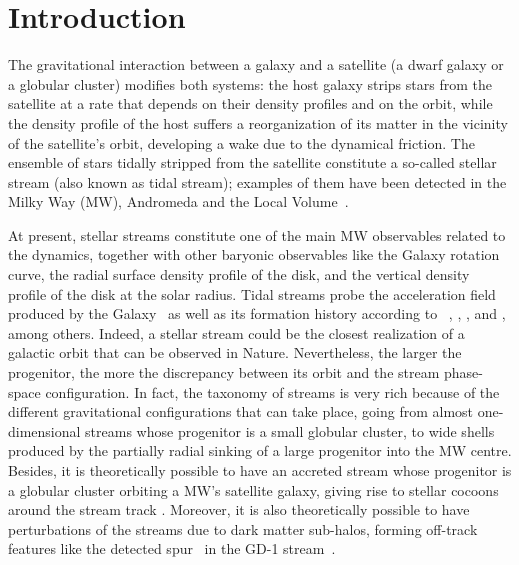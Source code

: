 \documentclass[twocolumn]{aa}
\begin{document}

   \maketitle

\section{Introduction}
The gravitational interaction between a galaxy and a satellite (a dwarf galaxy or a globular cluster) modifies both systems: the host galaxy strips stars from the satellite at a rate
that depends on their density profiles and on the orbit,
while the density profile of the host suffers a reorganization of its matter in the vicinity of the satellite's orbit, developing a wake due to the dynamical friction.
The ensemble of stars tidally stripped from the satellite constitute a so-called stellar stream (also known as tidal stream); examples of them have been detected in the Milky Way (MW), Andromeda and the Local Volume~\citep{Mart_Delgado_2010}.

At present, stellar streams constitute one of the main MW observables related to the dynamics, together with other baryonic observables like the Galaxy rotation curve, the radial surface density profile of the disk, and the vertical density profile of the disk at the solar radius.
Tidal streams probe the acceleration field produced by the Galaxy~\citep{1999ApJ...512L.109J,1999A&A...348L..49Z,2009ApJ...703L..67L,2013MNRAS.436.2386L,2016ASSL..420..169J,Ibata_2016,2017ApJ...842..120I,2017A&A...603A..65T,2021MNRAS.502.4170R} as well as its formation history according to ~\citet{1999Natur.402...53H}, \citet{2020ARA&A..58..205H}, \citet{2022A&A...666A..64R}, and \citet{2023arXiv230708730C}, among others.
Indeed, a stellar stream could be the closest realization of a galactic orbit that can be observed in Nature.
Nevertheless, the larger the progenitor, the more the discrepancy between its orbit and the stream phase-space configuration. In fact, the taxonomy of streams is very rich \citep{2015MNRAS.450..575A} because of the different gravitational configurations that can take place, going from almost one-dimensional streams whose progenitor is a small globular cluster, to wide shells produced by the partially radial sinking of a large progenitor into the MW centre. Besides, it is theoretically possible to have an accreted stream whose progenitor is a globular cluster orbiting a MW's satellite galaxy, giving rise to stellar cocoons around the
stream track \citep{2018ApJ...861...69C,2019ApJ...881..106M,2021MNRAS.501..179M,2021ApJ...911L..32G,2022MNRAS.511.2339Q}.
Moreover, it is also theoretically possible to have perturbations of the streams due to dark matter sub-halos, forming off-track features like the detected spur~\citep{Price-Whelan_2018} in
the GD-1 stream~\citep{Grillmair_2006}.
\end{document}
